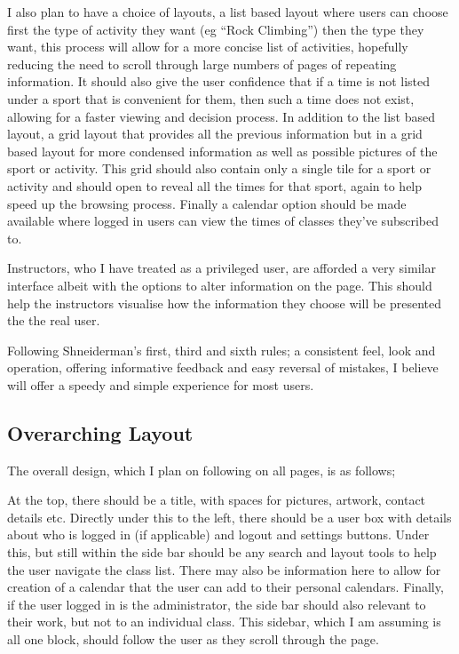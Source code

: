 \documentclass[10pt]{article}
\begin{document}
      I also plan to have a choice of layouts, a list based layout where users can choose first the type of activity they want (eg ``Rock Climbing'') then the type they want, this process will allow for a more concise list of activities, hopefully reducing the need to scroll through large numbers of pages of repeating information. It should also give the user confidence that if a time is not listed under a sport that is convenient for them, then such a time does not exist, allowing for a faster viewing and decision process. In addition to the list based layout, a grid layout that provides all the previous information but in a grid based layout for more condensed information as well as possible pictures of the sport or activity. This grid should also contain only a single tile for a sport or activity and should open to reveal all the times for that sport, again to help speed up the browsing process. Finally a calendar option should be made available where logged in users can view the times of classes they've subscribed to.

      Instructors, who I have treated as a privileged user, are afforded a very similar interface albeit with the options to alter information on the page. This should help the instructors visualise how the information they choose will be presented the the real user. 

      
      Following Shneiderman’s first, third and sixth rules; a consistent feel, look and operation, offering informative feedback and easy reversal of mistakes, I believe will offer a speedy and simple experience for most users.

      \subsection{Overarching Layout}
        The overall design, which I plan on following on all pages, is as follows;

        At the top, there should be a title, with spaces for pictures, artwork, contact details etc. Directly under this to the left, there should be a user box with details about who is logged in (if applicable) and logout and settings buttons. Under this, but still within the side bar should be any search and layout tools to help the user navigate the class list. There may also be information here to allow for creation of a calendar that the user can add to their personal calendars. Finally, if the user logged in is the administrator, the side bar should also relevant to their work, but not to an individual class. This sidebar, which I am assuming is all one block, should follow the user as they scroll through the page.
\end{document}
